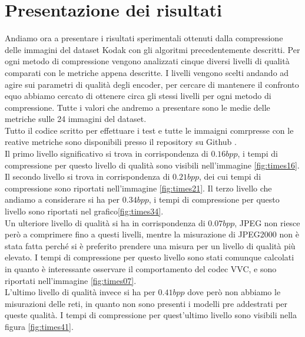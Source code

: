 \section{Presentazione dei risultati}
Andiamo ora a presentare i risultati sperimentali ottenuti dalla compressione delle immagini del dataset Kodak con gli algoritmi precedentemente descritti. Per ogni metodo di compressione vengono analizzati cinque diversi livelli di qualità comparati con le metriche appena descritte. I livelli vengono scelti andando ad agire sui parametri di qualità degli encoder, per cercare di mantenere il confronto equo abbiamo cercato di ottenere circa gli stessi livelli per ogni metodo di compressione. Tutte i valori che andremo a presentare sono le medie delle metriche sulle 24 immagini del dataset.\\
Tutto il codice scritto per effettuare i test e tutte le immaigni comrpresse con le reative metriche sono disponibili presso il repository su Github \cite{CodeImagecompressionAI}.\\
Il primo livello significativo si trova in corrispondenza di $0.16bpp$, i tempi di compressione per questo livello di qualità sono visibili nell’immagine \ref{fig:times16}. Il secondo livello si trova in corrispondenza di $0.21bpp$, dei cui tempi di compressione sono riportati nell’immagine \ref{fig:times21}. Il terzo livello che andiamo a considerare si ha per $0.34bpp$, i tempi di compressione per questo livello sono riportati nel grafico\ref{fig:times34}.\\
Un ulteriore livello di qualità si ha in corrispondenza di $0.07bpp$, JPEG non riesce però a comprimere fino a questi livelli, mentre la misurazione di JPEG2000 non è stata fatta perché si è preferito prendere una misura per un livello di qualità più elevato. I tempi di compressione per questo livello sono stati comunque calcolati in quanto è interessante osservare il comportamento del codec VVC, e sono riportati nell’immagine \ref{fig:times07}.\\
L’ultimo livello di qualità invece si ha per $0.41bpp$ dove però non abbiamo le misurazioni delle reti, in quanto non sono presenti i modelli pre addestrati per queste qualità. I tempi di compressione per quest’ultimo livello sono visibili nella figura \ref{fig:times41}.\\

